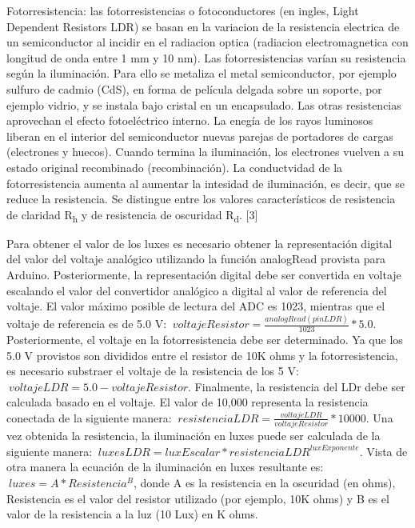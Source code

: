 \documentclass[conference]{IEEEtran}
\begin{document}
Fotorresistencia: las fotorresistencias o fotoconductores (en ingles, Light Dependent Resistors LDR) se basan en la variacion de la resistencia electrica de un semiconductor al incidir en el radiacion optica (radiacion electromagnetica con longitud de onda entre 1 mm y 10 nm). Las fotorresistencias varían su resistencia según la iluminación. Para ello se metaliza el metal semiconductor, por ejemplo sulfuro de cadmio (CdS), en forma de película delgada sobre un soporte, por ejemplo vidrio, y se instala bajo cristal en un encapsulado. Las otras resistencias aprovechan el efecto fotoeléctrico interno. La enegía de los rayos luminosos liberan en el interior del semiconductor nuevas parejas de portadores de cargas (electrones y huecos). Cuando termina la iluminación, los electrones vuelven a su estado original recombinado (recombinación). La conductvidad de la fotorresistencia aumenta al aumentar la intesidad de iluminación, es decir, que se reduce la resistencia. Se distingue entre los valores característicos de resistencia de claridad R\textsubscript{h} y de resistencia de oscuridad R\textsubscript{d}. [3]

Para obtener el valor de los luxes es necesario obtener la representación digital del valor del voltaje analógico utilizando la función analogRead provista para Arduino. Posteriormente, la representación digital debe ser convertida en voltaje escalando el valor del convertidor analógico a digital al valor de referencia del voltaje. El valor máximo posible de lectura del ADC es 1023, mientras que el voltaje de referencia es de 5.0 V: $ \ voltajeResistor = \frac{analogRead(pinLDR)}{1023} * 5.0 $.
Posteriormente, el voltaje en la fotorresistencia debe ser determinado. Ya que los 5.0 V provistos son divididos entre el resistor de 10K ohms y la fotorresistencia, es necesario substraer el voltaje de la resistencia de los 5 V: $ \ voltajeLDR =  5.0 - voltajeResistor$.
Finalmente, la resistencia del LDr debe ser calculada basado en el voltaje. El valor de 10,000 representa la resistencia conectada de la siguiente manera: $ \ resistenciaLDR = \frac{voltajeLDR}{voltajeResistor} * 10000 $.
Una vez obtenida la resistencia, la iluminación en luxes puede ser calculada de la siguiente manera: $ \ luxesLDR = luxEscalar * resistenciaLDR^{luxExponente} $. Vista de otra manera la ecuación de la iluminación en luxes resultante es: $ \ luxes = A * Resistencia^{B} $, donde A es la resistencia en la oscuridad (en ohms), Resistencia es el valor del resistor utilizado (por ejemplo, 10K ohms) y B es el valor de la resistencia a la luz (10 Lux) en K ohms.
\end{document}
